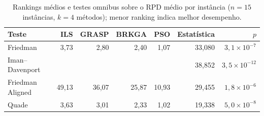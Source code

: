 \begin{table}[t]
\centering
\caption{Rankings médios e testes omnibus sobre o RPD médio por instância ($n=15$ instâncias, $k=4$ métodos); menor ranking indica melhor desempenho.}
\label{tab:omnibus}
\footnotesize
\begin{tabular}{@{}lrrrrrr@{}}
\toprule
Teste & ILS & GRASP & BRKGA & PSO & Estatística & $p$ \\
\midrule
Friedman & 3,73 & 2,80 & 2,40 & 1,07 & 33,080 & $3,1\times10^{-7}$ \\
Iman--Davenport &  &  &  &  & 38,852 & $3,5\times10^{-12}$ \\
Friedman Aligned & 49,13 & 36,07 & 25,87 & 10,93 & 29,455 & $1,8\times10^{-6}$ \\
Quade & 3,63 & 3,01 & 2,33 & 1,02 & 19,338 & $5,0\times10^{-8}$ \\
\bottomrule
\end{tabular}
\end{table}
